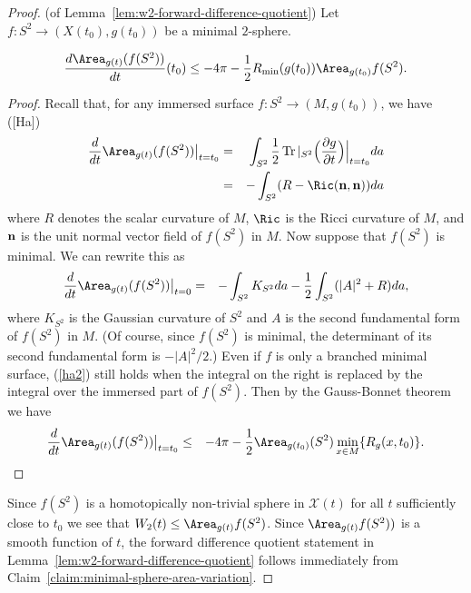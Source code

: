 \begin{proof}
(of Lemma~\ref{lem:w2-forward-difference-quotient})
Let $f\colon S^2\to (X(t_0),g(t_0))$ be a minimal $2$-sphere.

\begin{claim}
\label{claim:minimal-sphere-area-variation}
\label{varareaform}
$$\frac{d\Area_{g(t)}(f(S^2))}{dt}(t_0)\le -4\pi -\frac{1}{2}
R_{\min}(g(t_0))\Area_{g(t_0)}f(S^2).$$
\end{claim}



\begin{proof}
 Recall that, for any immersed surface $f\colon S^2\to (M,g(t_0))$, we
have ([Ha])
 \begin{eqnarray}\label{ha1}
 \frac{d}{dt}\Area_{g(t)}(f(S^2))\bigl|_{t=t_0}\bigr. & = &
 \int_{S^2}\frac{1}{2}\operatorname{Tr}|_{S^2}\Bigl(\frac{\partial g}{\partial t}\Bigr)\Bigl|_{t=t_0}\Bigr.da \\
 & = &
 -\int_{S^2}(R-\Ric({\bf n},{\bf n}))da \nonumber
 \end{eqnarray}
 where $R$ denotes the scalar curvature of $M$, $\Ric$ is the
Ricci curvature of $M$, and ${\bf n}$ is the unit normal vector field of $f(S^2)$
in $M$. Now suppose that $f(S^2)$ is minimal. We can rewrite this as
 \begin{eqnarray}
 \frac{d}{dt}\Area_{g(t)}(f(S^2))\big |_{t=0}
 &= &
 -\int_{S^2}K_{S^2}da-\frac{1}{2}\int_{S^2}(|A|^2+R)da,  \label{ha2}
 \end{eqnarray}
where $K_{S^2}$ is the Gaussian curvature of $S^2$ and $A$ is the
second fundamental form of $f(S^2)$ in $M$. (Of course, since
$f(S^2)$ is minimal, the determinant of its second fundamental form
is $-|A|^2/2$.) Even if $f$ is only a branched minimal surface,
(\ref{ha2}) still holds when  the integral on the right is replaced
by the integral over the immersed part of $f(S^2)$. Then by the
Gauss-Bonnet theorem we have
 \begin{eqnarray}
\frac{d}{dt}\Area_{g(t)}(f(S^2))\bigl|_{t=t_0}\bigr.  & \leq &
-4\pi-\frac{1}{2}\Area_{g(t_0)}(S^2)\min_{x\in M}\{R_{g}(x,t_0)\}.  \label{ha3}
 \end{eqnarray}
\end{proof}




Since $f(S^2)$ is a homotopically non-trivial sphere in ${\mathcal X}(t)$ for
all $t$ sufficiently close to $t_0$ we see that $W_2(t)\le \Area_{g(t)}f(S^2)$. Since $\Area_{g(t)}f(S^2))$ is a smooth function of
$t$, the forward difference quotient statement in Lemma~\ref{lem:w2-forward-difference-quotient} follows
immediately from Claim~\ref{claim:minimal-sphere-area-variation}.


\end{proof}
